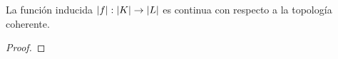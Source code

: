 \begin{ejercicio}\label{ej:55}
  La funci\'on inducida $\left| f \right|:\left| K \right|\rightarrow\left| L \right|$ es continua con respecto a la topolog\'ia coherente.
\end{ejercicio}
\begin{proof}%

\end{proof}%

